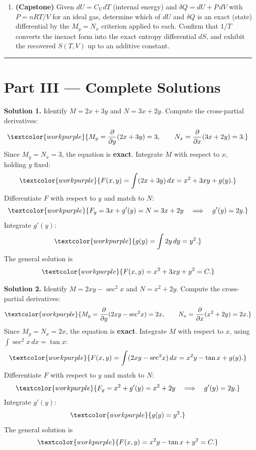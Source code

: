 \begin{enumerate}[leftmargin=2em, itemsep=8pt]
    \item \textbf{(Capstone)} Given $dU = C_V\,dT$ (internal energy) and
          $\delta Q = dU + P\,dV$ with $P = nRT/V$ for an ideal gas, determine
          which of $dU$ and $\delta Q$ is an exact (state) differential by the
          $M_y = N_x$ criterion applied to each. Confirm that $1/T$ converts
          the inexact form into the exact entropy differential $dS$, and
          exhibit the recovered $S(T,V)$ up to an additive constant.

\end{enumerate}

\vspace{0.4em}
\hrule
\vspace{0.6em}

\clearpage
{}
{}
\section*{Part III --- Complete Solutions}

\noindent\textbf{Solution 1.}\quad
Identify $M = 2x + 3y$ and $N = 3x + 2y$. Compute the cross-partial
derivatives:
\[
  \textcolor{workpurple}{M_y = \frac{\partial}{\partial y}(2x + 3y) = 3,
  \qquad
  N_x = \frac{\partial}{\partial x}(3x + 2y) = 3.}
\]
Since $M_y = N_x = 3$, the equation is \textbf{exact}.
Integrate $M$ with respect to $x$, holding $y$ fixed:
\[
  \textcolor{workpurple}{F(x,y) = \int(2x + 3y)\,dx = x^2 + 3xy + g(y).}
\]
Differentiate $F$ with respect to $y$ and match to $N$:
\[
  \textcolor{workpurple}{F_y = 3x + g'(y) = N = 3x + 2y
  \quad\Longrightarrow\quad g'(y) = 2y.}
\]
Integrate $g'(y)$:
\[
  \textcolor{workpurple}{g(y) = \int 2y\,dy = y^2.}
\]
The general solution is
\[
  \textcolor{workpurple}{F(x,y) = x^2 + 3xy + y^2 = C.}
\]

\medskip

\noindent\textbf{Solution 2.}\quad
Identify $M = 2xy - \sec^2\!x$ and $N = x^2 + 2y$. Compute the
cross-partial derivatives:
\[
  \textcolor{workpurple}{M_y = \frac{\partial}{\partial y}(2xy - \sec^2\!x) = 2x,
  \qquad
  N_x = \frac{\partial}{\partial x}(x^2 + 2y) = 2x.}
\]
Since $M_y = N_x = 2x$, the equation is \textbf{exact}.
Integrate $M$ with respect to $x$, using $\int\sec^2\!x\,dx = \tan x$:
\[
  \textcolor{workpurple}{F(x,y)
  = \int(2xy - \sec^2\!x)\,dx
  = x^2 y - \tan x + g(y).}
\]
Differentiate $F$ with respect to $y$ and match to $N$:
\[
  \textcolor{workpurple}{F_y = x^2 + g'(y) = x^2 + 2y
  \quad\Longrightarrow\quad g'(y) = 2y.}
\]
Integrate $g'(y)$:
\[
  \textcolor{workpurple}{g(y) = y^2.}
\]
The general solution is
\[
  \textcolor{workpurple}{F(x,y) = x^2 y - \tan x + y^2 = C.}
\]

